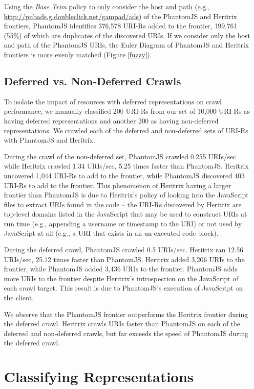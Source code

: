 \documentclass{ipres_proc_article-sp}
\begin{document}
Using the \emph{Base Trim} policy to only consider the host and path (e.g., \url{http://pubads.g.doubleclick.net/gampad/ads}) of the PhantomJS and Heritrix frontiers, PhantomJS identifies 376,578 URI-Rs added to the frontier, 199,761 (55\%) of which are duplicates of the discovered URIs. If we consider only the host and path of the PhantomJS URIs, the Euler Diagram of PhantomJS and Heritrix frontiers is more evenly matched (Figure \ref{fuzzy}).


\subsection{Deferred vs. Non-Deferred Crawls}
\label{deferVnon}
To isolate the impact of resources with deferred representations on crawl performance, we manually classified 200 URI-Rs from our set of 10,000 URI-Rs as having deferred representations and another 200 as having non-deferred representations. We crawled each of the deferred and non-deferred sets of URI-Rs with PhantomJS and Heritrix. 

During the crawl of the non-deferred set, PhantomJS crawled 0.255 URIs/sec while Heritrix crawled 1.34 URIs/sec, 5.25 times faster than PhantomJS. Heritrix uncovered 1,044 URI-Rs to add to the frontier, while PhantomJS discovered 403 URI-Rs to add to the frontier. This phenomenon of Heritrix having a larger frontier than PhantomJS is due to Heritrix's policy of looking into the JavaScript files to extract URIs found in the code -- the URI-Rs discovered by Heritrix are top-level domains listed in the JavaScript that may be used to construct URIs at run time (e.g., appending a username or timestamp to the URI) or not used by JavaScript at all (e.g., a URI that exists in an un-executed code block). 

During the deferred crawl, PhantomJS crawled 0.5 URIs/sec. Heritrix ran 12.56 URIs/sec, 25.12 times faster than PhantomJS. Heritrix added 3,206 URIs to the frontier, while PhantomJS added 3,436 URIs to the frontier. PhantomJS adds more URIs to the frontier despite Heritrix's introspection on the JavaScript of each crawl target. This result is due to PhantomJS's execution of JavaScript on the client.

We observe that the PhantomJS frontier outperforms the Heritrix frontier during the deferred crawl. Heritrix crawls URIs faster than PhantomJS on each of the deferred and non-deferred crawls, but far exceeds the speed of PhantomJS during the deferred crawl.

\section{Classifying Representations}
\label{classifying}
\end{document}
